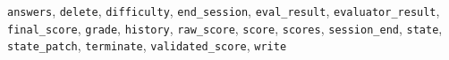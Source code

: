 \texttt{answers}, \texttt{delete}, \texttt{difficulty}, \texttt{end\_session}, \texttt{eval\_result}, \texttt{evaluator\_result}, \texttt{final\_score}, \texttt{grade}, \texttt{history}, \texttt{raw\_score}, \texttt{score}, \texttt{scores}, \texttt{session\_end}, \texttt{state}, \texttt{state\_patch}, \texttt{terminate}, \texttt{validated\_score}, \texttt{write}